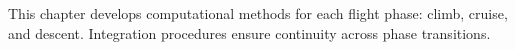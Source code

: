 This chapter develops computational methods for each flight phase: climb, cruise, and descent. Integration procedures ensure continuity across phase transitions.

